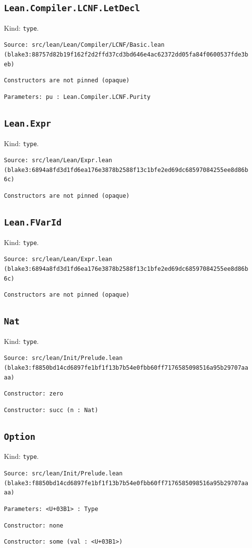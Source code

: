 \documentclass[11pt]{article}
\begin{document}
\subsection*{\texttt{Lean.Compiler.LCNF.LetDecl}}
\noindent Kind: \texttt{type}.\par
\noindent \texttt{Source: src/lean/Lean/Compiler/LCNF/Basic.lean (blake3:88757d82b19f162f2d2ffd37cd3bd646e4ac62372dd05fa84f0600537fde3beb)}\par
\noindent \texttt{Constructors are not pinned (opaque)}\par
\noindent \texttt{Parameters: pu : Lean.Compiler.LCNF.Purity}\par
\subsection*{\texttt{Lean.Expr}}
\noindent Kind: \texttt{type}.\par
\noindent \texttt{Source: src/lean/Lean/Expr.lean (blake3:6894a8fd3d1fd6ea176e3878b2588f13c1bfe2ed69dc68597084255ee8d86b6c)}\par
\noindent \texttt{Constructors are not pinned (opaque)}\par
\subsection*{\texttt{Lean.FVarId}}
\noindent Kind: \texttt{type}.\par
\noindent \texttt{Source: src/lean/Lean/Expr.lean (blake3:6894a8fd3d1fd6ea176e3878b2588f13c1bfe2ed69dc68597084255ee8d86b6c)}\par
\noindent \texttt{Constructors are not pinned (opaque)}\par
\subsection*{\texttt{Nat}}
\noindent Kind: \texttt{type}.\par
\noindent \texttt{Source: src/lean/Init/Prelude.lean (blake3:f8850bd14cd6897fe1bf1f13b7b54e0fbb60ff7176585098516a95b29707aaaa)}\par
\noindent \texttt{Constructor: zero }\par
\noindent \texttt{Constructor: succ (n : Nat)}\par
\subsection*{\texttt{Option}}
\noindent Kind: \texttt{type}.\par
\noindent \texttt{Source: src/lean/Init/Prelude.lean (blake3:f8850bd14cd6897fe1bf1f13b7b54e0fbb60ff7176585098516a95b29707aaaa)}\par
\noindent \texttt{Parameters: <U+03B1> : Type}\par
\noindent \texttt{Constructor: none }\par
\noindent \texttt{Constructor: some (val : <U+03B1>)}\par
\end{document}

